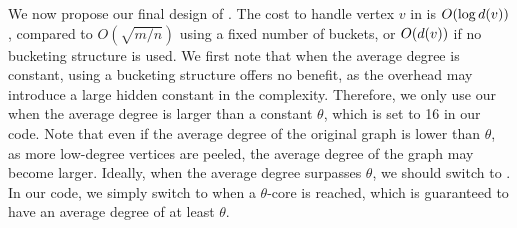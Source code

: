 We now propose our final design of \HBS{}.
The cost to handle vertex $v$ in \HBS{} is $O(\log d(v))$, 
compared to $O(\sqrt{m/n})$ using a fixed number of buckets, or $O(d(v))$ if no bucketing structure is used.
We first note that when the average degree is constant, 
using a bucketing structure offers no benefit, 
as the overhead may introduce a large hidden constant in the complexity.
Therefore, we only use our \HBS{} when the average degree is larger than a constant $\theta$, which is set to 16 in our code.
Note that even if the average degree of the original graph is lower than $\theta$, 
as more low-degree vertices are peeled, the average degree of the graph may become larger. 
Ideally, when the average degree surpasses $\theta$, we should switch to \HBS{}. 
In our code, we simply switch to \HBS{} when a $\theta$-core is reached, 
which is guaranteed to have an average degree of at least $\theta$. 

%


